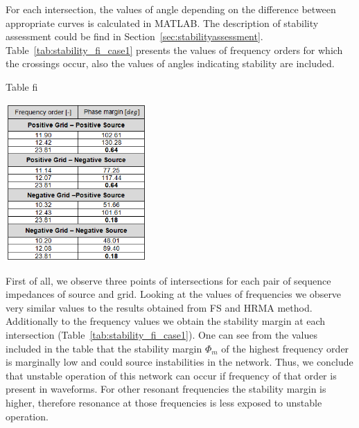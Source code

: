\documentclass[12pt]{report} %
\begin{document}
For each intersection, the values of angle depending on the difference between appropriate curves is calculated in MATLAB. The description of stability assessment could be find in Section~\ref{sec:stabilityassessment}. Table~\ref{tab:stability_fi_case1} presents the values of frequency orders for which the crossings occur, also the values of angles indicating stability are included.

\begin{table}[htb]
	\centering
	\caption{Table fi}
	\includegraphics[width=0.4\textwidth]{img/Case1/stability_fi.png}
  	\label{tab:stability_fi_case1}
\end{table}
\FloatBarrier
First of all, we observe three points of intersections for each pair of sequence impedances of source and grid. Looking at the values of frequencies we observe very similar values to the results obtained from FS and HRMA method. Additionally to the frequency values we obtain the stability margin at each intersection (Table~\ref{tab:stability_fi_case1}). One can see from the values included in the table that the stability margin $\Phi_m$ of the highest frequency order is marginally low and could source instabilities in the network. Thus, we conclude that unstable operation of this network can occur if frequency of that order is present in waveforms. For other resonant frequencies the stability margin is higher, therefore resonance at those frequencies is less exposed to unstable operation.
\end{document}
